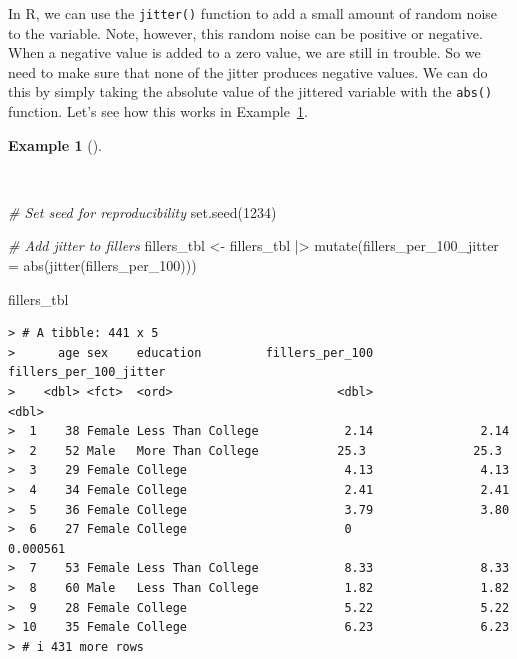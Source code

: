 \documentclass[
  letterpaper,
]{latex/krantz}
\newenvironment{Shaded}{\begin{snugshade}}{\end{snugshade}}
\newcommand{\AttributeTok}[1]{\textcolor[rgb]{0.00,0.00,0.00}{#1}}
\newcommand{\CommentTok}[1]{\textcolor[rgb]{0.00,0.00,0.00}{\textit{#1}}}
\newcommand{\DecValTok}[1]{\textcolor[rgb]{0.00,0.00,0.00}{#1}}
\newcommand{\FunctionTok}[1]{\textcolor[rgb]{0.00,0.00,0.00}{#1}}
\newcommand{\NormalTok}[1]{\textcolor[rgb]{0.00,0.00,0.00}{#1}}
\newcommand{\OtherTok}[1]{\textcolor[rgb]{0.00,0.00,0.00}{#1}}
\newcommand{\SpecialCharTok}[1]{\textcolor[rgb]{0.00,0.00,0.00}{#1}}
\theoremstyle{definition}
\newtheorem{example}{Example}[chapter]
\theoremstyle{remark}
\begin{document}
In R, we can use the \texttt{jitter()} function to add a small amount of
random noise to the variable. Note, however, this random noise can be
positive or negative. When a negative value is added to a zero value, we
are still in trouble. So we need to make sure that none of the jitter
produces negative values. We can do this by simply taking the absolute
value of the jittered variable with the \texttt{abs()} function. Let's
see how this works in Example~\ref{exm-ida-num-uni-jitter}.

\begin{example}[]\protect\hypertarget{exm-ida-num-uni-jitter}{}\label{exm-ida-num-uni-jitter}

~

\begin{Shaded}
\begin{Highlighting}[]
\CommentTok{\# Set seed for reproducibility}
\FunctionTok{set.seed}\NormalTok{(}\DecValTok{1234}\NormalTok{)}

\CommentTok{\# Add jitter to fillers}
\NormalTok{fillers\_tbl }\OtherTok{\textless{}{-}}
\NormalTok{  fillers\_tbl }\SpecialCharTok{|\textgreater{}}
  \FunctionTok{mutate}\NormalTok{(}\AttributeTok{fillers\_per\_100\_jitter =} \FunctionTok{abs}\NormalTok{(}\FunctionTok{jitter}\NormalTok{(fillers\_per\_100)))}

\NormalTok{fillers\_tbl}
\end{Highlighting}
\end{Shaded}

\begin{verbatim}
> # A tibble: 441 x 5
>      age sex    education         fillers_per_100 fillers_per_100_jitter
>    <dbl> <fct>  <ord>                       <dbl>                  <dbl>
>  1    38 Female Less Than College            2.14               2.14    
>  2    52 Male   More Than College           25.3               25.3     
>  3    29 Female College                      4.13               4.13    
>  4    34 Female College                      2.41               2.41    
>  5    36 Female College                      3.79               3.80    
>  6    27 Female College                      0                  0.000561
>  7    53 Female Less Than College            8.33               8.33    
>  8    60 Male   Less Than College            1.82               1.82    
>  9    28 Female College                      5.22               5.22    
> 10    35 Female College                      6.23               6.23    
> # i 431 more rows
\end{verbatim}

\end{example}
\end{document}
